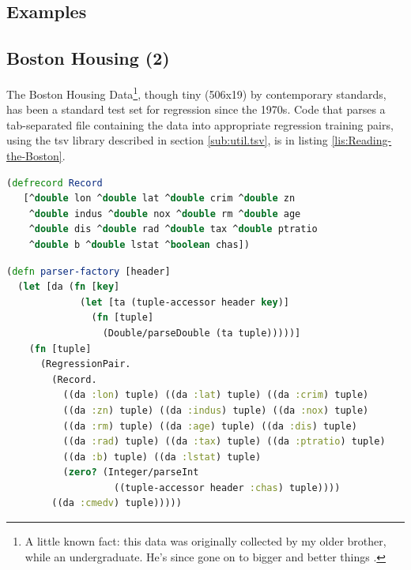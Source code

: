 \documentclass[11pt,openany,american,usenames,dvipsnames,svgnames,x11names,table,isodate]{article}
\numberwithin{equation}{section}
\numberwithin{figure}{section}
\begin{document}
\subsection{Examples}

\subsection{Boston Housing (2)}

The Boston Housing Data\footnote{A little known fact: this data was originally collected by my older
brother, while an undergraduate. He's since gone on to bigger and
better things \cite{BostonHousing}.}, though tiny (506x19) by contemporary standards, has been a standard
test set for regression since the 1970s. Code that parses a tab-separated
file containing the data into appropriate regression training pairs,
using the tsv library described in section \ref{sub:util.tsv}, is
in listing \ref{lis:Reading-the-Boston}.

\begin{minipage}[t]{1\columnwidth}%
\begin{lstlisting}[caption={Boston housing record class},label={lis:Reading-the-Boston},language=clojure,tabsize=2]
(defrecord Record
   [^double lon ^double lat ^double crim ^double zn 
    ^double indus ^double nox ^double rm ^double age 
    ^double dis ^double rad ^double tax ^double ptratio
    ^double b ^double lstat ^boolean chas]) 

\end{lstlisting}
%
\end{minipage}

\begin{minipage}[t]{1\columnwidth}%
\begin{lstlisting}[caption={Boston housing parser},label={lis:Reading-the-Boston-2},language=clojure,tabsize=2]
(defn parser-factory [header]
  (let [da (fn [key]
             (let [ta (tuple-accessor header key)] 
               (fn [tuple] 
                 (Double/parseDouble (ta tuple)))))]
    (fn [tuple]
      (RegressionPair.
        (Record.
          ((da :lon) tuple) ((da :lat) tuple) ((da :crim) tuple)
          ((da :zn) tuple) ((da :indus) tuple) ((da :nox) tuple)
          ((da :rm) tuple) ((da :age) tuple) ((da :dis) tuple)
          ((da :rad) tuple) ((da :tax) tuple) ((da :ptratio) tuple)
          ((da :b) tuple) ((da :lstat) tuple) 
          (zero? (Integer/parseInt 
                   ((tuple-accessor header :chas) tuple))))
        ((da :cmedv) tuple)))))
\end{lstlisting}
%
\end{minipage}
\end{document}

